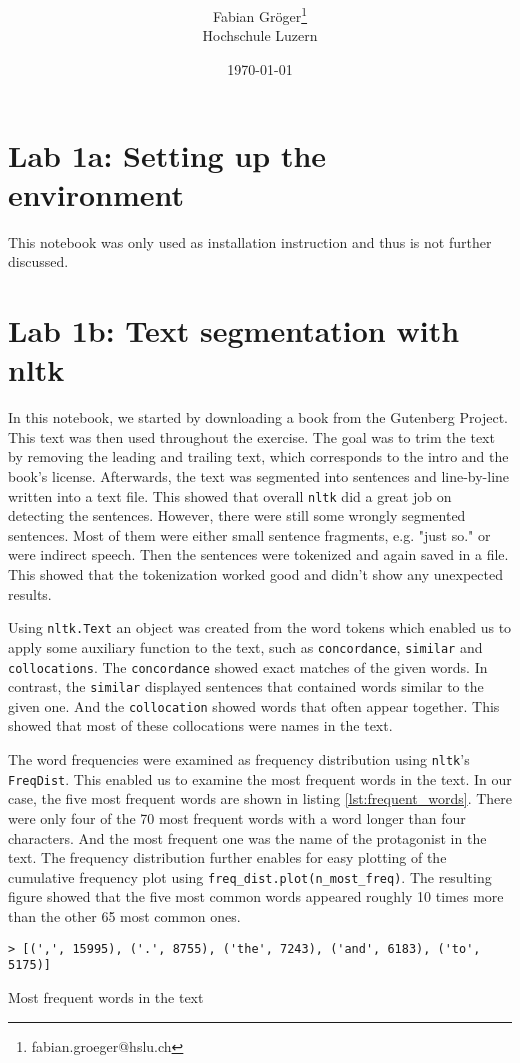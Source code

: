 \documentclass[onecolumn]{article}
\title{\spacecaps{Lab report: SW01 }\\ \normalsize \spacesc{TSM\_AnTeDe} }
\author{Fabian Gröger\thanks{fabian.groeger@hslu.ch}\\Hochschule Luzern}
\date{\today}
\begin{document}
\maketitle

\section{Lab 1a: Setting up the environment}
This notebook was only used as installation instruction and thus is not further discussed.

\section{Lab 1b: Text segmentation with nltk}
\label{sec:Lab1b}
In this notebook, we started by downloading a book from the Gutenberg Project. This text was then used throughout the exercise. The goal was to trim the text by removing the leading and trailing text, which corresponds to the intro and the book's license. Afterwards, the text was segmented into sentences and line-by-line written into a text file. This showed that overall \verb|nltk| did a great job on detecting the sentences. However, there were still some wrongly segmented sentences. Most of them were either small sentence fragments, e.g. "just so." or were indirect speech. Then the sentences were tokenized and again saved in a file. This showed that the tokenization worked good and didn't show any unexpected results.

Using \verb|nltk.Text| an object was created from the word tokens which enabled us to apply some auxiliary function to the text, such as \verb|concordance|, \verb|similar| and \verb|collocations|. The \verb|concordance| showed exact matches of the given words. In contrast, the \verb|similar| displayed sentences that contained words similar to the given one. And the \verb|collocation| showed words that often appear together. This showed that most of these collocations were names in the text.

The word frequencies were examined as frequency distribution using \verb|nltk|'s \verb|FreqDist|. This enabled us to examine the most frequent words in the text. In our case, the five most frequent words are shown in listing \ref{lst:frequent_words}. There were only four of the 70 most frequent words with a word longer than four characters. And the most frequent one was the name of the protagonist in the text. The frequency distribution further enables for easy plotting of the cumulative frequency plot using \verb|freq_dist.plot(n_most_freq)|. The resulting figure showed that the five most common words appeared roughly 10 times more than the other 65 most common ones.
\begin{listing}[ht]
\begin{verbatim}
> [(',', 15995), ('.', 8755), ('the', 7243), ('and', 6183), ('to', 5175)]
\end{verbatim}
\caption{Most frequent words in the text}
\label{lst:frequent_words}
\end{listing}
\end{document}
